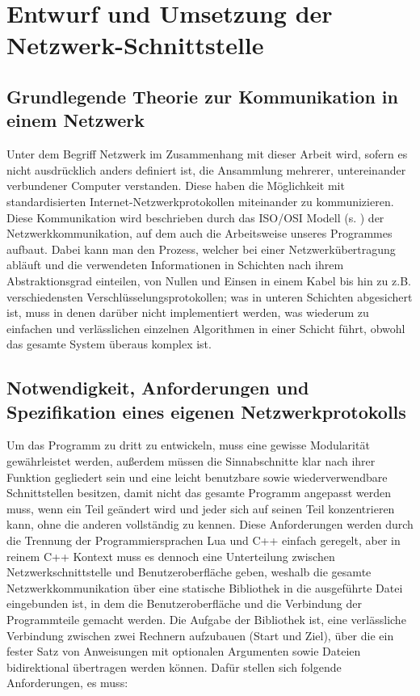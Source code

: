 
%
\section{Entwurf und Umsetzung der Netzwerk-Schnittstelle}
\subsection{Grundlegende Theorie zur Kommunikation in einem Netzwerk}
Unter dem Begriff Netzwerk im Zusammenhang mit dieser Arbeit wird, sofern es nicht ausdrücklich anders definiert ist, die Ansammlung mehrerer, untereinander verbundener Computer verstanden.
Diese haben die Möglichkeit mit standardisierten Internet-Netzwerkprotokollen miteinander zu kommunizieren.
Diese Kommunikation wird beschrieben durch das ISO/OSI Modell (s. ) der Netzwerkkommunikation, auf dem auch die Arbeitsweise unseres Programmes aufbaut.
Dabei kann man den Prozess, welcher bei einer Netzwerkübertragung abläuft und die verwendeten Informationen in Schichten nach ihrem Abstraktionsgrad einteilen, von Nullen und Einsen in einem Kabel bis hin zu z.B. verschiedensten Verschlüsselungsprotokollen; was in unteren Schichten abgesichert ist, muss in denen darüber nicht implementiert werden, was wiederum zu einfachen und verlässlichen einzelnen Algorithmen in einer Schicht führt, obwohl das gesamte System überaus komplex ist.

\subsection{Notwendigkeit, Anforderungen und Spezifikation eines eigenen Netzwerkprotokolls}
Um das Programm zu dritt zu entwickeln, muss eine gewisse Modularität gewährleistet werden, außerdem müssen die Sinnabschnitte klar nach ihrer Funktion gegliedert sein und eine leicht benutzbare sowie wiederverwendbare Schnittstellen besitzen, damit nicht das gesamte Programm angepasst werden muss, wenn ein Teil geändert wird und jeder sich auf seinen Teil konzentrieren kann, ohne die anderen vollständig zu kennen.
Diese Anforderungen werden durch die Trennung der Programmiersprachen Lua und C++ einfach geregelt, aber in reinem C++ Kontext muss es dennoch eine Unterteilung zwischen Netzwerkschnittstelle und Benutzeroberfläche geben, weshalb die gesamte Netzwerkkommunikation über eine statische Bibliothek in die ausgeführte Datei eingebunden ist, in dem die Benutzeroberfläche und die Verbindung der Programmteile gemacht werden.
Die Aufgabe der Bibliothek ist, eine verlässliche Verbindung zwischen zwei Rechnern aufzubauen (Start und Ziel), über die ein fester Satz von Anweisungen mit optionalen Argumenten sowie Dateien bidirektional übertragen werden können.
Dafür stellen sich folgende Anforderungen, es muss:

